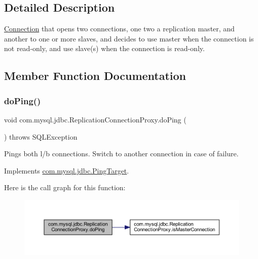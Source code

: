 \subsection{Detailed Description}
\mbox{\hyperlink{interfacecom_1_1mysql_1_1jdbc_1_1_connection}{Connection}} that opens two connections, one two a replication master, and another to one or more slaves, and decides to use master when the connection is not read-\/only, and use slave(s) when the connection is read-\/only. 

\subsection{Member Function Documentation}
\mbox{\label{classcom_1_1mysql_1_1jdbc_1_1_replication_connection_proxy_a44cea9c5b2aef7a32ea73568ab157eeb}} 
\subsubsection{\texorpdfstring{do\+Ping()}{doPing()}}
{\footnotesize\ttfamily void com.\+mysql.\+jdbc.\+Replication\+Connection\+Proxy.\+do\+Ping (\begin{DoxyParamCaption}{ }\end{DoxyParamCaption}) throws S\+Q\+L\+Exception}

Pings both l/b connections. Switch to another connection in case of failure. 

Implements \mbox{\hyperlink{interfacecom_1_1mysql_1_1jdbc_1_1_ping_target}{com.\+mysql.\+jdbc.\+Ping\+Target}}.

Here is the call graph for this function\+:
\nopagebreak
\begin{figure}[H]
\begin{center}
\leavevmode
\includegraphics[width=350pt]{classcom_1_1mysql_1_1jdbc_1_1_replication_connection_proxy_a44cea9c5b2aef7a32ea73568ab157eeb_cgraph}
\end{center}
\end{figure}
\mbox{\label{classcom_1_1mysql_1_1jdbc_1_1_replication_connection_proxy_ab25d7e5a9f2b59a77d9ec427dde0b7df}} 
